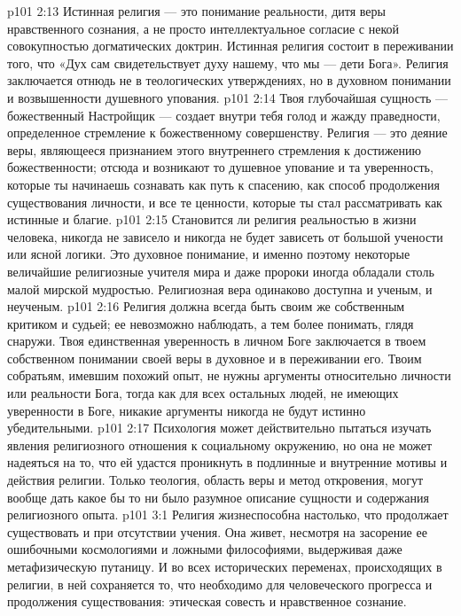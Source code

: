 \vs p101 2:13 Истинная религия --- это понимание реальности, дитя веры нравственного сознания, а не просто интеллектуальное согласие с некой совокупностью догматических доктрин. Истинная религия состоит в переживании того, что «Дух сам свидетельствует духу нашему, что мы --- дети Бога». Религия заключается отнюдь не в теологических утверждениях, но в духовном понимании и возвышенности душевного упования.
\vs p101 2:14 Твоя глубочайшая сущность --- божественный Настройщик --- создает внутри тебя голод и жажду праведности, определенное стремление к божественному совершенству. Религия --- это деяние веры, являющееся признанием этого внутреннего стремления к достижению божественности; отсюда и возникают то душевное упование и та уверенность, которые ты начинаешь сознавать как путь к спасению, как способ продолжения существования личности, и все те ценности, которые ты стал рассматривать как истинные и благие.
\vs p101 2:15 \pc Становится ли религия реальностью в жизни человека, никогда не зависело и никогда не будет зависеть от большой учености или ясной логики. Это духовное понимание, и именно поэтому некоторые величайшие религиозные учителя мира и даже пророки иногда обладали столь малой мирской мудростью. Религиозная вера одинаково доступна и ученым, и неученым.
\vs p101 2:16 Религия должна всегда быть своим же собственным критиком и судьей; ее невозможно наблюдать, а тем более понимать, глядя снаружи. Твоя единственная уверенность в личном Боге заключается в твоем собственном понимании своей веры в духовное и в переживании его. Твоим собратьям, имевшим похожий опыт, не нужны аргументы относительно личности или реальности Бога, тогда как для всех остальных людей, не имеющих уверенности в Боге, никакие аргументы никогда не будут истинно убедительными.
\vs p101 2:17 Психология может действительно пытаться изучать явления религиозного отношения к социальному окружению, но она не может надеяться на то, что ей удастся проникнуть в подлинные и внутренние мотивы и действия религии. Только теология, область веры и метод откровения, могут вообще дать какое бы то ни было разумное описание сущности и содержания религиозного опыта.
\vs p101 3:1 Религия жизнеспособна настолько, что продолжает существовать и при отсутствии учения. Она живет, несмотря на засорение ее ошибочными космологиями и ложными философиями, выдерживая даже метафизическую путаницу. И во всех исторических переменах, происходящих в религии, в ней сохраняется то, что необходимо для человеческого прогресса и продолжения существования: этическая совесть и нравственное сознание.
